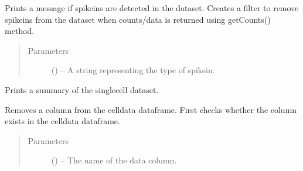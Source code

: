 \documentclass[letterpaper,10pt,english]{sphinxmanual}
\begin{document}
\begin{fulllineitems}
\begin{fulllineitems}
\label{\detokenize{index:singlecelldata.SingleCell.isSpike}}
Prints a message if spike\sphinxhyphen{}ins are detected in the dataset. Creates
a filter to remove spike\sphinxhyphen{}ins from the dataset when counts/data is
returned using getCounts() method.
\begin{quote}\begin{description}
\item[{Parameters}] \leavevmode
{} () – A string representing the type of spike\sphinxhyphen{}in.

\end{description}\end{quote}

\end{fulllineitems}


\begin{fulllineitems}
\label{\detokenize{index:singlecelldata.SingleCell.print}}
Prints a summary of the single\sphinxhyphen{}cell dataset.

\end{fulllineitems}


\begin{fulllineitems}
\label{\detokenize{index:singlecelldata.SingleCell.removeCellData}}
Removes a column from the celldata dataframe. First checks
whether the column exists in the celldata dataframe.
\begin{quote}\begin{description}
\item[{Parameters}] \leavevmode
{} () – The name of the data column.

\end{description}\end{quote}


\end{fulllineitems}
\end{fulllineitems}
\end{document}
